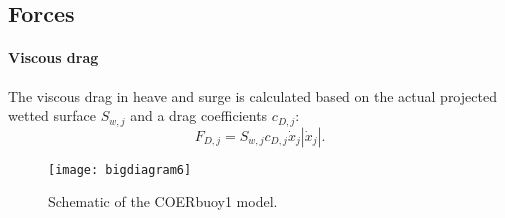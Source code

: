 \documentclass[oneside,10pt,a4paper]{book}
\begin{document}
\subsection{Forces}
\paragraph{Viscous drag}
The viscous drag in heave and surge is calculated based on the actual projected wetted surface $S_{w,j}$ and a drag coefficients $c_{D,j}$:
\begin{equation}
	F_{D,j}=S_{w,j}c_{D,j}\dot{x}_j|\dot{x}_j|\text{.}
\end{equation}
\begin{figure}[!t]
	\centering
	\texttt{[image: bigdiagram6]}
	\caption{Schematic of the COERbuoy1 model.}
	\label{fig:hydro}
\end{figure}
\end{document}
